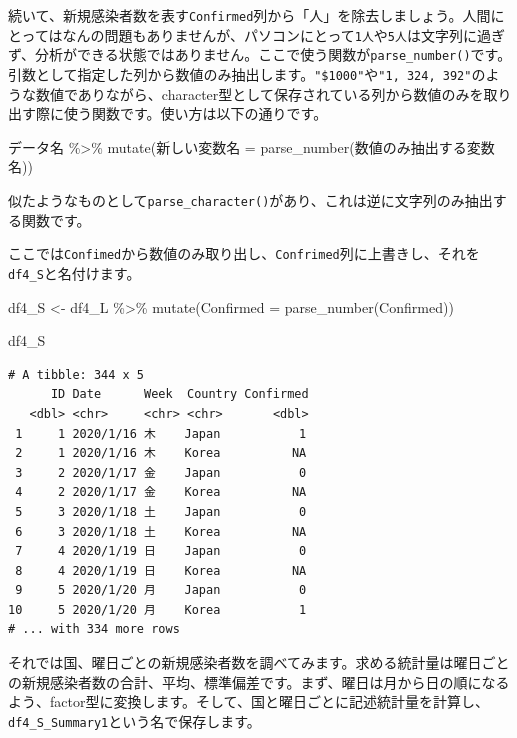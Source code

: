 \documentclass[
  a4paper,
  pandoc,
  ja=standard,
  jafont=haranoaji]{bxjsbook}
\newenvironment{Shaded}{\begin{snugshade}}{\end{snugshade}}
\newcommand{\AttributeTok}[1]{\textcolor[rgb]{0.00,0.48,0.65}{#1}}
\newcommand{\FunctionTok}[1]{\textcolor[rgb]{0.28,0.35,0.67}{#1}}
\newcommand{\NormalTok}[1]{\textcolor[rgb]{0.00,0.48,0.65}{#1}}
\newcommand{\OtherTok}[1]{\textcolor[rgb]{0.00,0.48,0.65}{#1}}
\newcommand{\SpecialCharTok}[1]{\textcolor[rgb]{0.37,0.37,0.37}{#1}}
\begin{document}
続いて、新規感染者数を表す\texttt{Confirmed}列から「人」を除去しましょう。人間にとってはなんの問題もありませんが、パソコンにとって\texttt{1人}や\texttt{5人}は文字列に過ぎず、分析ができる状態ではありません。ここで使う関数が\texttt{parse\_number()}です。引数として指定した列から数値のみ抽出します。\texttt{"\$1000"}や\texttt{"1,\ 324,\ 392"}のような数値でありながら、character型として保存されている列から数値のみを取り出す際に使う関数です。使い方は以下の通りです。

\begin{Shaded}
\begin{Highlighting}[numbers=left,,]
\NormalTok{データ名 }\SpecialCharTok{\%\textgreater{}\%}
  \FunctionTok{mutate}\NormalTok{(新しい変数名 }\OtherTok{=} \FunctionTok{parse\_number}\NormalTok{(数値のみ抽出する変数名))}
\end{Highlighting}
\end{Shaded}

似たようなものとして\texttt{parse\_character()}があり、これは逆に文字列のみ抽出する関数です。

ここでは\texttt{Confimed}から数値のみ取り出し、\texttt{Confrimed}列に上書きし、それを\texttt{df4\_S}と名付けます。

\begin{Shaded}
\begin{Highlighting}[numbers=left,,]
\NormalTok{df4\_S }\OtherTok{\textless{}{-}}\NormalTok{ df4\_L }\SpecialCharTok{\%\textgreater{}\%}
  \FunctionTok{mutate}\NormalTok{(}\AttributeTok{Confirmed =} \FunctionTok{parse\_number}\NormalTok{(Confirmed))}

\NormalTok{df4\_S}
\end{Highlighting}
\end{Shaded}

\begin{verbatim}
# A tibble: 344 x 5
      ID Date      Week  Country Confirmed
   <dbl> <chr>     <chr> <chr>       <dbl>
 1     1 2020/1/16 木    Japan           1
 2     1 2020/1/16 木    Korea          NA
 3     2 2020/1/17 金    Japan           0
 4     2 2020/1/17 金    Korea          NA
 5     3 2020/1/18 土    Japan           0
 6     3 2020/1/18 土    Korea          NA
 7     4 2020/1/19 日    Japan           0
 8     4 2020/1/19 日    Korea          NA
 9     5 2020/1/20 月    Japan           0
10     5 2020/1/20 月    Korea           1
# ... with 334 more rows
\end{verbatim}

それでは国、曜日ごとの新規感染者数を調べてみます。求める統計量は曜日ごとの新規感染者数の合計、平均、標準偏差です。まず、曜日は月から日の順になるよう、factor型に変換します。そして、国と曜日ごとに記述統計量を計算し、\texttt{df4\_S\_Summary1}という名で保存します。
\end{document}
